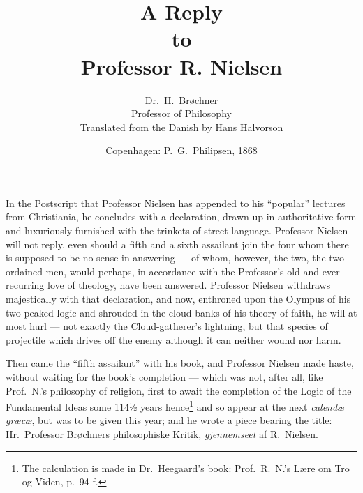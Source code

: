 \documentclass[12pt,a4paper]{book}
\title{\textbf{A Reply\\[2pt] to\\[2pt] Professor R. Nielsen}}
\author{Dr.\ H.\ Brøchner\\[4pt]
  \small Professor of Philosophy\\[6pt]
  \small Translated from the Danish by Hans Halvorson}
\date{Copenhagen: P.\ G.\ Philipsen, 1868}
\begin{document}
\maketitle
\thispagestyle{empty}
\newpage


\setcounter{footnote}{0}
In the Postscript that Professor Nielsen has appended to his ``popular''
lectures from Christiania, he concludes with a declaration, drawn up in
authoritative form and luxuriously furnished with the trinkets of street
language. Professor Nielsen will not reply, even should a fifth and a sixth
assailant join the four whom there is supposed to be no sense in answering ---
of whom, however, the two, the two ordained men, would perhaps, in accordance
with the Professor's old and ever-recurring love of theology, have been
answered.
Professor Nielsen withdraws majestically with that declaration, and now,
enthroned upon the Olympus of his two-peaked logic and shrouded in the
cloud-banks of his theory of faith, he will at most hurl --- not exactly the
Cloud-gatherer's lightning, but that species of projectile which drives off the
enemy although it can neither wound nor harm.

Then came the ``fifth assailant'' with his book, and Professor Nielsen made
haste, without waiting for the book's completion --- which was not, after all,
like Prof.\ N.'s philosophy of religion, first to await the completion of the
Logic of the Fundamental Ideas some
114½ years hence\footnote{%
  The calculation is made in Dr.\ Heegaard's book: Prof.\ R.\ N.'s Lære om Tro
  og Viden, p.\ 94 f.}
and so appear at the next \textit{calendæ græcæ}, but was to be given this
year; and he wrote a piece bearing the title: Hr.\ Professor Brøchners
philosophiske Kritik, \emph{gjennemseet} af R.\ Nielsen.
\end{document}
